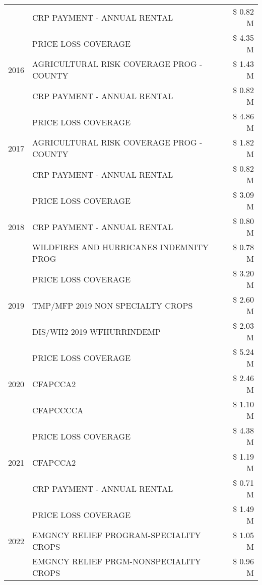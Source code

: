 \begin{tabular}{llr}
 & CRP PAYMENT - ANNUAL RENTAL & \$ 0.82 M \\
\cline{1-3}
\multirow[t]{3}{*}{2016} & PRICE LOSS COVERAGE & \$ 4.35 M \\
 & AGRICULTURAL RISK COVERAGE PROG - COUNTY & \$ 1.43 M \\
 & CRP PAYMENT - ANNUAL RENTAL & \$ 0.82 M \\
\cline{1-3}
\multirow[t]{3}{*}{2017} & PRICE LOSS COVERAGE & \$ 4.86 M \\
 & AGRICULTURAL RISK COVERAGE PROG - COUNTY & \$ 1.82 M \\
 & CRP PAYMENT - ANNUAL RENTAL & \$ 0.82 M \\
\cline{1-3}
\multirow[t]{3}{*}{2018} & PRICE LOSS COVERAGE & \$ 3.09 M \\
 & CRP PAYMENT - ANNUAL RENTAL & \$ 0.80 M \\
 & WILDFIRES AND HURRICANES INDEMNITY PROG & \$ 0.78 M \\
\cline{1-3}
\multirow[t]{3}{*}{2019} & PRICE LOSS COVERAGE & \$ 3.20 M \\
 & TMP/MFP 2019 NON SPECIALTY CROPS & \$ 2.60 M \\
 & DIS/WH2 2019 WFHURRINDEMP & \$ 2.03 M \\
\cline{1-3}
\multirow[t]{3}{*}{2020} & PRICE LOSS COVERAGE & \$ 5.24 M \\
 & CFAPCCA2 & \$ 2.46 M \\
 & CFAPCCCCA & \$ 1.10 M \\
\cline{1-3}
\multirow[t]{3}{*}{2021} & PRICE LOSS COVERAGE & \$ 4.38 M \\
 & CFAPCCA2 & \$ 1.19 M \\
 & CRP PAYMENT - ANNUAL RENTAL & \$ 0.71 M \\
\cline{1-3}
\multirow[t]{3}{*}{2022} & PRICE LOSS COVERAGE & \$ 1.49 M \\
 & EMGNCY RELIEF PROGRAM-SPECIALITY CROPS & \$ 1.05 M \\
 & EMGNCY RELIEF PRGM-NONSPECIALITY CROPS & \$ 0.96 M \\
\cline{1-3}
\bottomrule
\end{tabular}
